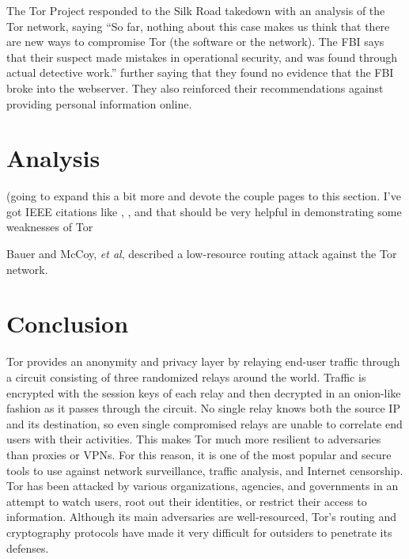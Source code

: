 \documentclass[journal]{IEEEtran}
\begin{document}
The Tor Project responded to the Silk Road takedown with an analysis of the Tor network, saying ``So far, nothing about this case makes us think that there are new ways to compromise Tor (the software or the network). The FBI says that their suspect made mistakes in operational security, and was found through actual detective work.'' further saying that they found no evidence that the FBI broke into the webserver. They also reinforced their recommendations against providing personal information online.\cite{TorBlogSilkRoad}

\section{Analysis}

(going to expand this a bit more and devote the couple pages to this section. I've got IEEE citations like \cite{Xin2009}, \cite{Ling2011}, and \cite{Ling2012} that should be very helpful in demonstrating some weaknesses of Tor

Bauer and McCoy, \textit{et al}, described a low-resource routing attack against the Tor network.\cite{Bauer2007}



\section{Conclusion}

Tor provides an anonymity and privacy layer by relaying end-user traffic through a circuit consisting of three randomized relays around the world. Traffic is encrypted with the session keys of each relay and then decrypted in an onion-like fashion as it passes through the circuit. No single relay knows both the source IP and its destination, so even single compromised relays are unable to correlate end users with their activities. This makes Tor much more resilient to adversaries than proxies or VPNs. For this reason, it is one of the most popular and secure tools to use against network surveillance, traffic analysis, and Internet censorship. Tor has been attacked by various organizations, agencies, and governments in an attempt to watch users, root out their identities, or restrict their access to information. Although its main adversaries are well-resourced, Tor's routing and cryptography protocols have made it very difficult for outsiders to penetrate its defenses.
\end{document}
